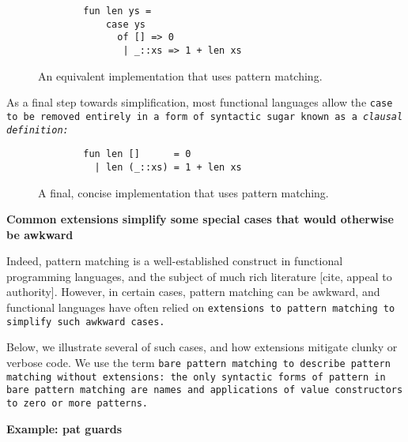 \documentclass[manuscript,screen,review, 12pt]{acmart}
\begin{document}
\begin{outline}[enumerate]
\begin{figure}[htt]
    \smllst
    \begin{lstlisting}
        fun len ys =
            case ys 
              of [] => 0
               | _::xs => 1 + len xs
        \end{lstlisting}
    \caption{An equivalent implementation that uses pattern matching.}
    \label{fig:pmlen}
    \end{figure}

    As a final step towards simplification, most functional languages allow the
    \tt{case} to be removed entirely in a form of syntactic sugar known as a
    \it{clausal definition}:

    \begin{figure}[ht]
    \smllst
    \begin{lstlisting}
        fun len []      = 0
          | len (_::xs) = 1 + len xs
        \end{lstlisting}
    \caption{A final, concise implementation that uses pattern matching.}
    \label{fig:pmclausallen}
    \end{figure}
        

    \1 \bf{Common extensions simplify some special cases that would otherwise be awkward}

    Indeed, pattern matching is a well-established construct in functional
    programming languages, and the subject of much rich literature [cite, appeal
    to authority]. However, in certain cases, pattern matching can be awkward,
    and functional languages have often relied on \tt{extensions} to pattern
    matching to simplify such awkward cases. 

    Below, we illustrate several of such cases, and how extensions mitigate 
    clunky or verbose code. We use the term \tt{bare pattern matching} to 
    describe pattern matching \tt{without} extensions: the only syntactic 
    forms of pattern in bare pattern matching are names and applications of 
    value constructors to zero or more patterns. 
    
    
    \2 \bf{Example: pat guards} 


\end{outline}
\end{document}
